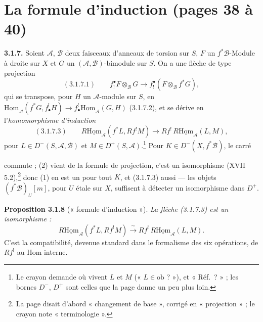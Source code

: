 \documentclass[11pt,a4paper]{article}
\begin{document}
\section*{La formule d'induction (pages 38 à 40)}

\textbf{3.1.7.} Soient $\mathcal{A}$, $\mathcal{B}$ deux faisceaux d'anneaux
de torsion sur $S$, $F$ un $f^*\mathcal{B}$-Module à droite sur $X$ et $G$ un
$(\mathcal{A}, \mathcal{B})$-bimodule sur $S$. On a une flèche de type
projection
\[
(3.1.7.1)\qquad f_!^{\bullet}F \otimes_{\mathcal{B}} G \longrightarrow
f_!^{\bullet}(F \otimes_{\mathcal{B}} f^*G),
\]
qui se transpose, pour $H$ un $\mathcal{A}$-module sur $S$, en
$\underline{\mathrm{Hom}}_{\mathcal{A}}(f^*G, f^!_{\bullet}H) \to
f^!_{\bullet}\underline{\mathrm{Hom}}_{\mathcal{A}}(G, H)$ (3.1.7.2), et se
dérive en l'\emph{homomorphisme d'induction}
\[
(3.1.7.3)\qquad R\underline{\mathrm{Hom}}_{\mathcal{A}}(f^*L, Rf^!M)
\longrightarrow Rf^!\,R\underline{\mathrm{Hom}}_{\mathcal{A}}(L, M),
\]
pour $L \in D^-(S, \mathcal{A}, \mathcal{B})$ et $M \in D^+(S,
\mathcal{A})$.\footnote{Le crayon demande où vivent $L$ et $M$ (« $L \in
\mathrm{ob}$ ? »), et « Réf.\ ? » ; les bornes $D^-$, $D^+$ sont celles que la
page donne un peu plus loin.} Pour $K \in D^-(X, f^*\mathcal{B})$, le carré


commute ; (2) vient de la formule de projection, c'est un isomorphisme
(XVII 5.2),\footnote{La page disait d'abord « changement de base », corrigé
en « projection » ; le crayon note « terminologie ».} donc (1) en est un pour
tout $K$, et (3.1.7.3) aussi --- les objets $(f^*\mathcal{B})_U[m]$, pour $U$
étale sur $X$, suffisent à détecter un isomorphisme dans $D^+$.

\textbf{Proposition 3.1.8} (« formule d'induction »). \emph{La flèche
(3.1.7.3) est un isomorphisme :}
\[
R\underline{\mathrm{Hom}}_{\mathcal{A}}(f^*L, Rf^!M) \xrightarrow{\ \sim\ }
Rf^!\,R\underline{\mathrm{Hom}}_{\mathcal{A}}(L, M).
\]
C'est la compatibilité, devenue standard dans le formalisme des six
opérations, de $Rf^!$ au $\underline{\mathrm{Hom}}$ interne.
\end{document}
